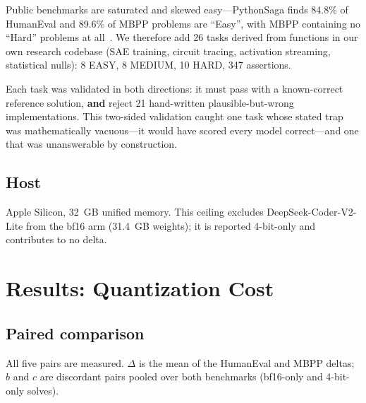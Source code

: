 \documentclass[11pt]{article}
\begin{document}
Public benchmarks are saturated and skewed easy---PythonSaga finds 84.8\% of HumanEval
and 89.6\% of MBPP problems are ``Easy'', with MBPP containing no ``Hard'' problems at
all~\citep{yadav2024pythonsaga}. We therefore add 26 tasks derived from functions in our
own research codebase (SAE training, circuit tracing, activation streaming, statistical
nulls): 8 EASY, 8 MEDIUM, 10 HARD, 347 assertions.

Each task was validated in both directions: it must pass with a known-correct reference
solution, \textbf{and} reject 21 hand-written plausible-but-wrong implementations. This
two-sided validation caught one task whose stated trap was mathematically vacuous---it
would have scored every model correct---and one that was unanswerable by construction.

\subsection{Host}

Apple Silicon, 32~GB unified memory. This ceiling excludes DeepSeek-Coder-V2-Lite from
the bf16 arm (31.4~GB weights); it is reported 4-bit-only and contributes to no delta.

\section{Results: Quantization Cost}
\label{sec:results}

\subsection{Paired comparison}
\label{sec:paired}

All five pairs are measured. $\Delta$ is the mean of the HumanEval and MBPP deltas; $b$
and $c$ are discordant pairs pooled over both benchmarks (bf16-only and 4-bit-only
solves).
\end{document}

